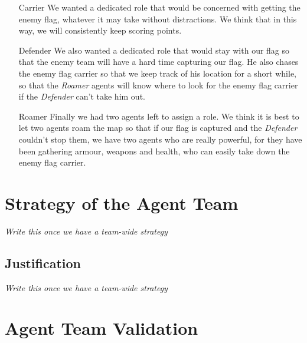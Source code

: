 \begin{enumerate}
\item[Carrier] We wanted a dedicated role that would be concerned with getting the enemy flag, whatever it may take without distractions. We think that in this way, we will consistently keep scoring points.

\item[Defender] We also wanted a dedicated role that would stay with our flag so that the enemy team will have a hard time capturing our flag. He also chases the enemy flag carrier so that we keep track of his location for a short while, so that the \emph{Roamer} agents will know where to look for the enemy flag carrier if the \emph{Defender} can't take him out.

\item[Roamer] Finally we had two agents left to assign a role. We think it is best to let two agents roam the map so that if our flag is captured and the \emph{Defender} couldn't stop them, we have two agents who are really powerful, for they have been gathering armour, weapons and health, who can easily take down the enemy flag carrier.
\end{enumerate} 

\section{Strategy of the Agent Team}
\emph{Write this once we have a team-wide strategy}

\subsection{Justification}
\emph{Write this once we have a team-wide strategy}

\section{Agent Team Validation}
